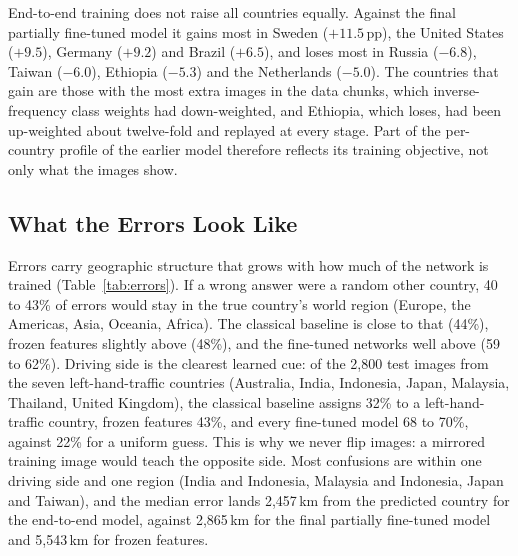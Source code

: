 \documentclass[clean,twocolumn]{bam-project}
\newcommand{\pp}{\,pp}
\begin{document}
End-to-end training does not raise all countries equally. Against the final partially fine-tuned model it
gains most in Sweden ($+11.5$\pp), the United States ($+9.5$), Germany ($+9.2$) and Brazil ($+6.5$), and loses
most in Russia ($-6.8$), Taiwan ($-6.0$), Ethiopia ($-5.3$) and the Netherlands ($-5.0$). The countries that gain
are those with the most extra images in the data chunks, which inverse-frequency class weights had
down-weighted, and Ethiopia, which loses, had been up-weighted about twelve-fold and replayed at every
stage. Part of the per-country profile of the earlier model therefore reflects its training objective, not
only what the images show.

\subsection{What the Errors Look Like}
Errors carry geographic structure that grows with how much of the network is trained
(Table~\ref{tab:errors}). If a wrong answer were a random other country, 40 to 43\% of errors would stay in
the true country's world region (Europe, the Americas, Asia, Oceania, Africa). The classical baseline is
close to that (44\%), frozen features slightly above (48\%), and the fine-tuned networks well above (59 to
62\%). Driving side is the clearest learned cue: of the 2{,}800 test images from the seven left-hand-traffic
countries (Australia, India, Indonesia, Japan, Malaysia, Thailand, United Kingdom), the classical baseline
assigns 32\% to a left-hand-traffic country, frozen features 43\%, and every fine-tuned model 68 to 70\%,
against 22\% for a uniform guess. This is why we never flip images: a mirrored training image would teach
the opposite side. Most confusions are within one driving side and one region (India and Indonesia,
Malaysia and Indonesia, Japan and Taiwan), and the median error lands 2{,}457\,km from the predicted
country for the end-to-end model, against 2{,}865\,km for the final partially fine-tuned model and
5{,}543\,km for frozen features.
\end{document}
